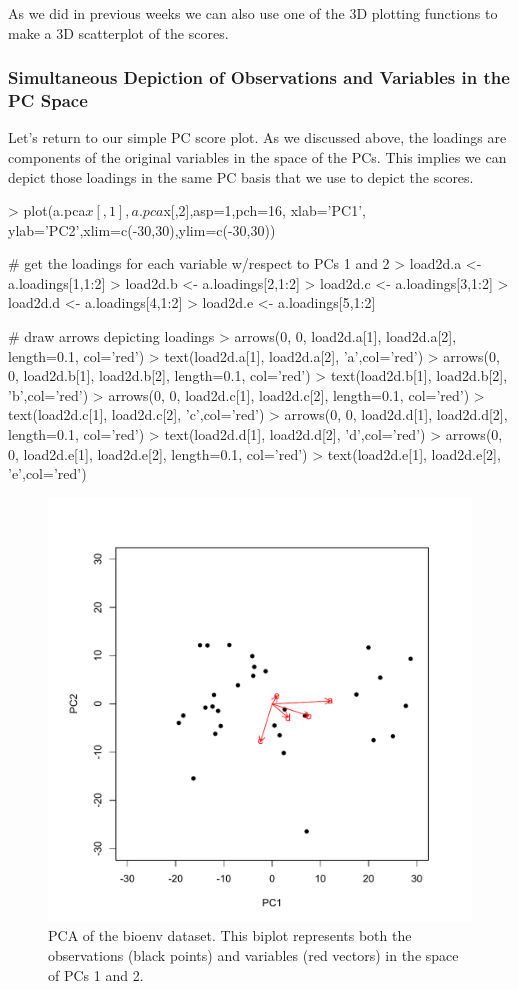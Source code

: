 As we did in previous weeks we can also use one of the 3D plotting functions to make a 3D scatterplot of the scores.

\subsubsection{Simultaneous Depiction of Observations and Variables in the PC Space}

Let's return to our simple PC score plot.  As we discussed above, the loadings are components of the original variables in the space of the PCs. This implies we can depict those loadings in the same PC basis that we use to depict the scores.
%
\begin{R}
> plot(a.pca$x[,1], a.pca$x[,2],asp=1,pch=16, xlab='PC1', ylab='PC2',xlim=c(-30,30),ylim=c(-30,30))

# get the loadings for each variable w/respect to PCs 1 and 2
> load2d.a <- a.loadings[1,1:2]
> load2d.b <- a.loadings[2,1:2]
> load2d.c <- a.loadings[3,1:2]
> load2d.d <- a.loadings[4,1:2]
> load2d.e <- a.loadings[5,1:2]

# draw arrows depicting loadings
> arrows(0, 0, load2d.a[1], load2d.a[2], length=0.1, col='red')
> text(load2d.a[1], load2d.a[2], 'a',col='red')
> arrows(0, 0, load2d.b[1], load2d.b[2], length=0.1, col='red')
> text(load2d.b[1], load2d.b[2], 'b',col='red')
> arrows(0, 0, load2d.c[1], load2d.c[2], length=0.1, col='red')
> text(load2d.c[1], load2d.c[2], 'c',col='red')
> arrows(0, 0, load2d.d[1], load2d.d[2], length=0.1, col='red')
> text(load2d.d[1], load2d.d[2], 'd',col='red')
> arrows(0, 0, load2d.e[1], load2d.e[2], length=0.1, col='red')
> text(load2d.e[1], load2d.e[2], 'e',col='red')
\end{R}
%
\begin{figure}[htbp]
\centering
\includegraphics[width=0.5\columnwidth]{./figures/hands-on5/bioenv-simplebiplot.pdf}
\caption{PCA of the bioenv dataset. This biplot represents both the observations (black points) and variables (red vectors) in the space of PCs 1 and 2.}\label{fig:bioenvbiplot}
\end{figure}

